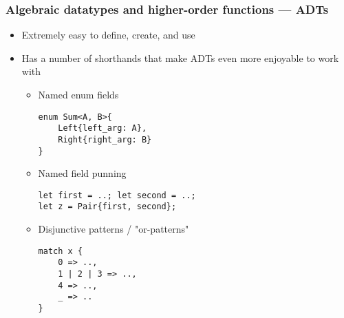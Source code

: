 \documentclass[t]{beamer}
\begin{document}
\begin{frame}[fragile]
\frametitle{Algebraic datatypes and higher-order functions --- ADTs}

\begin{itemize}
\item Extremely easy to define, create, and use
\item Has a number of shorthands that make ADTs even more enjoyable to work with
\begin{itemize}
\medskip
\item Named enum fields
\begin{verbatim}
enum Sum<A, B>{
    Left{left_arg: A},
    Right{right_arg: B}
}
\end{verbatim}
\medskip
\item Named field punning
\begin{verbatim}
let first = ..; let second = ..;
let z = Pair{first, second};
\end{verbatim}
\medskip
\item Disjunctive patterns / "or-patterns"
\begin{verbatim}
match x {
    0 => ..,
    1 | 2 | 3 => ..,
    4 => ..,
    _ => ..
}
\end{verbatim}
\end{itemize}
\end{itemize}

\end{frame}
\end{document}
